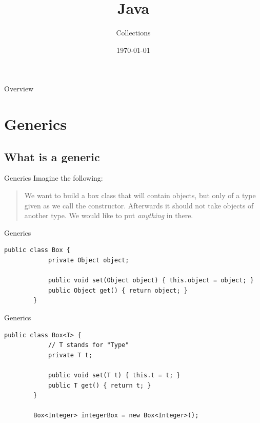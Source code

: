 


\title{Java}
\subtitle{Collections}
\date{\today}

\usepackage{color}



\begin{frame}
\titlepage
\end{frame}

\begin{frame}{Overview}
\tableofcontents
\end{frame}

\section{Generics}
\subsection{What is a generic}
\begin{frame}[fragile]{Generics}
	Imagine the following:\\
	\vspace{0.5cm}
	\begin{quotation}
		We want to build a box class that will contain objects, but only of a type given as we call the constructor. Afterwards it should not take objects of another type. We would like to put \emph{anything} in there.
	\end{quotation}
\end{frame}

\begin{frame}[fragile]{Generics}
	\begin{lstlisting}[basicstyle=\ttfamily\scriptsize]
		public class Box {
			private Object object;

			public void set(Object object) { this.object = object; }
			public Object get() { return object; }
		}

	\end{lstlisting}
\end{frame}

\begin{frame}[fragile]{Generics}
	\begin{lstlisting}[basicstyle=\ttfamily\scriptsize]
		public class Box<T> {
		    // T stands for "Type"
		    private T t;

		    public void set(T t) { this.t = t; }
		    public T get() { return t; }
		}
		
		Box<Integer> integerBox = new Box<Integer>();

	\end{lstlisting}
\end{frame}

